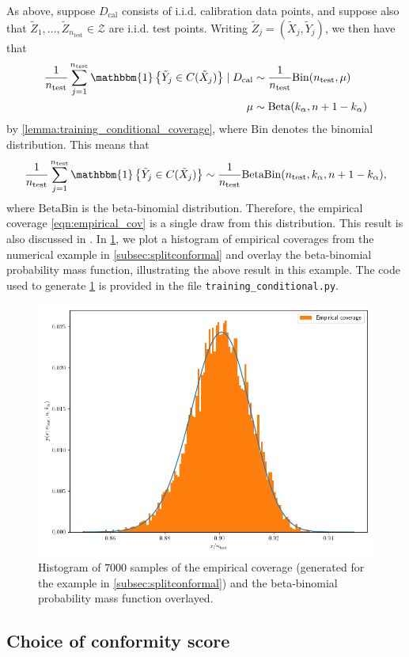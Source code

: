\documentclass[11pt, titlepage]{article} %
\newcommand{\R}{\mathrm}
\newcommand{\Ind}[1]{\mathbbm{1}\left\{ #1 \right\}}
\numberwithin{equation}{section}
\theoremstyle{definition}
\numberwithin{theorem}{section}
\numberwithin{lemma}{section}
\numberwithin{corollary}{section}
\numberwithin{proposition}{section}
\numberwithin{definition}{section}
\numberwithin{remark}{section}
\begin{document}
\noindent
As above, suppose \(D_\R{cal}\) consists of i.i.d. calibration data points, and suppose also that \(\tilde{Z}_1, \ldots, \tilde{Z}_{n_\R{test}} \in \mathcal{Z}\) are i.i.d. test points. Writing \(\tilde{Z}_j = (\tilde{X}_j, \tilde{Y}_j)\), we then have that \begin{align*}
    \frac{1}{n_\R{test}} \sum_{j=1}^{n_\R{test}} \Ind{\tilde{Y}_j \in C(\tilde{X}_j)} \mid D_\R{cal} &\sim \frac{1}{n_\R{test}} \R{Bin}(n_\R{test}, \mu) \\
    \mu &\sim \R{Beta}(k_\alpha, n + 1 - k_\alpha)
\end{align*} by \cref{lemma:training_conditional_coverage}, where \(\R{Bin}\) denotes the binomial distribution. This means that \[\frac{1}{n_\R{test}} \sum_{j=1}^{n_\R{test}} \Ind{\tilde{Y}_j \in C(\tilde{X}_j)} \sim \frac{1}{n_\R{test}}\R{BetaBin}(n_\R{test}, k_\alpha, n+1-k_\alpha),\] where \(\R{BetaBin}\) is the beta-binomial distribution. Therefore, the empirical coverage \eqref{eqn:empirical_cov} is a single draw from this distribution. This result is also discussed in \cite{angelopoulos2021gentle,tibs_advanced_topics}. In \cref{fig:beta_bin_dist}, we plot a histogram of empirical coverages from the numerical example in \cref{subsec:splitconformal} and overlay the beta-binomial probability mass function, illustrating the above result in this example. The code used to generate \cref{fig:beta_bin_dist} is provided in the file \verb|training_conditional.py|.

\begin{figure}[H]
    \centering
    \includegraphics[width=0.6\linewidth]{figures/2_3_training_beta_dist.png}
    \caption{Histogram of \(7000\) samples of the empirical coverage (generated for the example in \cref{subsec:splitconformal}) and the beta-binomial probability mass function overlayed.}
\label{fig:beta_bin_dist}
\end{figure}

\subsection{Choice of conformity score}
\label{subsec:conformityscore}
\end{document}
